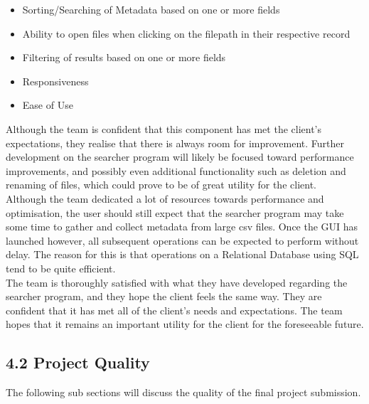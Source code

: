 \documentclass[11pt]{article}
\begin{document}
\begin{adjustwidth}{1cm}{}
\begin{itemize}
\item Sorting/Searching of Metadata based on one or more fields
\item Ability to open files when clicking on the filepath in their respective record
\item Filtering of results based on one or more fields
\item Responsiveness
\item Ease of Use
\end{itemize}

Although the team is confident that this component has met the client’s expectations, they realise that there is always room for improvement. Further development on the searcher program will likely be focused toward performance improvements, and possibly even additional functionality such as deletion and renaming of files, which could prove to be of great utility for the client. \\

Although the team dedicated a lot of resources towards performance and optimisation, the user should still expect that the searcher program may take some time to gather and collect metadata from large csv files. Once the GUI has launched however, all subsequent operations can be expected to perform without delay. The reason for this is that operations on a Relational Database using SQL tend to be quite efficient. \\

The team is thoroughly satisfied with what they have developed regarding the searcher program, and they hope the client feels the same way. They are confident that it has met all of the client's needs and expectations. The team hopes that it remains an important utility for the client for the foreseeable future.

\end{adjustwidth}

\subsection{4.2 Project Quality}
The following sub sections will discuss the quality of the final project submission.
\end{document}
